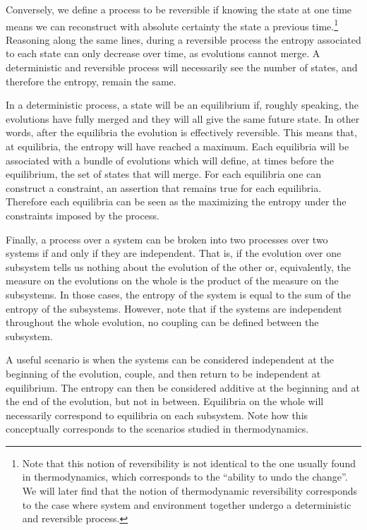 \documentclass[letterpaper]{article}
\begin{document}
Conversely, we define a process to be reversible if knowing the state at one time means we can reconstruct with absolute certainty the state a previous time.\footnote{Note that this notion of reversibility is not identical to the one usually found in thermodynamics, which corresponds to the ``ability to undo the change''. We will later find that the notion of thermodynamic reversibility corresponds to the case where system and environment together undergo a deterministic and reversible process.} Reasoning along the same lines, during a reversible process the entropy associated to each state can only decrease over time, as evolutions cannot merge. A deterministic and reversible process will necessarily see the number of states, and therefore the entropy, remain the same.

In a deterministic process, a state will be an equilibrium if, roughly speaking, the evolutions have fully merged and they will all give the same future state. In other words, after the equilibria the evolution is effectively reversible. This means that, at equilibria, the entropy will have reached a maximum. Each equilibria will be associated with a bundle of evolutions which will define, at times before the equilibrium, the set of states that will merge. For each equilibria one can construct a constraint, an assertion that remains true for each equilibria. Therefore each equilibria can be seen as the maximizing the entropy under the constraints imposed by the process.

Finally, a process over a system can be broken into two processes over two systems if and only if they are independent. That is, if the evolution over one subsystem tells us nothing about the evolution of the other or, equivalently, the measure on the evolutions on the whole is the product of the measure on the subsystems. In those cases, the entropy of the system is equal to the sum of the entropy of the subsystems. However, note that if the systems are independent throughout the whole evolution, no coupling can be defined between the subsystem.

A useful scenario is when the systems can be considered independent at the beginning of the evolution, couple, and then return to be independent at equilibrium. The entropy can then be considered additive at the beginning and at the end of the evolution, but not in between. Equilibria on the whole will necessarily correspond to equilibria on each subsystem. Note how this conceptually corresponds to the scenarios studied in thermodynamics.
\end{document}
